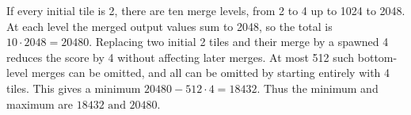 If every initial tile is 2, there are ten merge levels, from 2 to 4 up to 1024 to 2048. At each level the merged output values sum to 2048, so the total is $10\cdot2048=20480$. Replacing two initial 2 tiles and their merge by a spawned 4 reduces the score by 4 without affecting later merges. At most 512 such bottom-level merges can be omitted, and all can be omitted by starting entirely with 4 tiles. This gives a minimum $20480-512\cdot4=18432$. Thus the minimum and maximum are $\boxed{18432\text{ and }20480}$.
